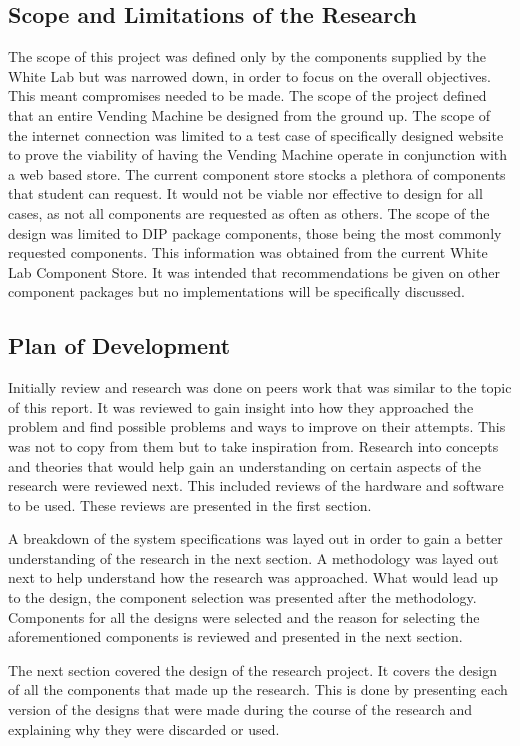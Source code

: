 \documentclass[a4paper,11pt]{article}
\numberwithin{figure}{section}
\numberwithin{table}{section}
\begin{document}
	\subsection{Scope and Limitations of the Research}
The scope of this project was defined only by the components supplied by the White Lab but was narrowed down, in order to focus on the overall objectives. This meant compromises needed to be made. The scope of the project defined that an entire Vending Machine be designed from the ground up. The scope of the internet connection was limited to a test case of specifically designed website to prove the viability of having the Vending Machine operate in conjunction with a web based store. The current component store stocks a plethora of components that student can request. It would not be viable nor effective to design for all cases, as not all components are requested as often as others. The scope of the design was limited to DIP package components, those being the most commonly requested components. This information was obtained from the current White Lab Component Store. It was intended that recommendations be given on other component packages but no implementations will be specifically discussed. 
	\subsection{Plan of Development}	
Initially review and research was done on peers work that was similar to the topic of this report. It was reviewed to gain insight into how they approached the problem and find possible problems and ways to improve on their attempts. This was not to copy from them but to take inspiration from. Research into concepts and theories that would help gain an understanding on certain aspects of the research were reviewed next. This included reviews of the hardware and software to be used. These reviews are presented in the first section.

A breakdown of the system specifications was layed out in order to gain a better understanding of the research in the next section. A methodology was layed out next to help understand how the research was approached. What would lead up to the design, the component selection was presented after the methodology. Components for all the designs were selected and the reason for selecting the aforementioned components is reviewed and presented in the next section.

The next section covered the design of the research project. It covers the design of all the components that made up the research. This is done by presenting each version of the designs that were made during the course of the research and explaining why they were discarded or used.
\end{document}
